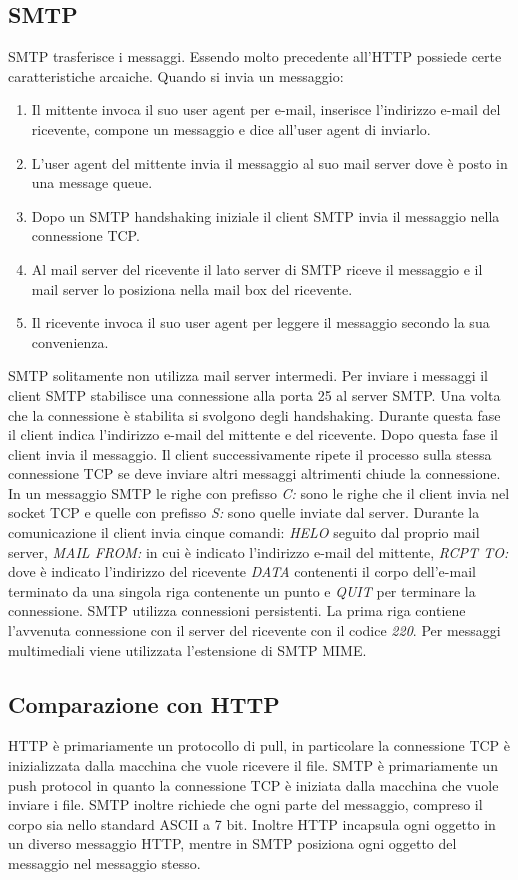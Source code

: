 \subsection{SMTP}
SMTP trasferisce i messaggi. Essendo molto precedente all'HTTP possiede certe caratteristiche arcaiche. Quando si invia un messaggio:
\begin{enumerate}
\item Il mittente invoca il suo user agent per e-mail, inserisce l'indirizzo e-mail del ricevente, compone un messaggio e dice all'user agent di inviarlo.
\item L'user agent del mittente invia il messaggio al suo mail server dove \`e posto in una message queue.
\item Dopo un SMTP handshaking iniziale il client SMTP invia il messaggio nella connessione TCP.
\item Al mail server del ricevente il lato server di SMTP riceve il messaggio e il mail server lo posiziona nella mail box del ricevente.
\item Il ricevente invoca il suo user agent per leggere il messaggio secondo la sua convenienza.
\end{enumerate}
SMTP solitamente non utilizza mail server intermedi. Per inviare i messaggi il client SMTP stabilisce una connessione alla porta 25 al server SMTP. Una volta che la connessione \`e stabilita si svolgono degli 
handshaking. Durante questa fase il client indica l'indirizzo e-mail del mittente e del ricevente. Dopo questa fase il client invia il messaggio. Il client successivamente ripete il processo sulla stessa connessione 
TCP se deve inviare altri messaggi altrimenti chiude la connessione. In un messaggio SMTP le righe con prefisso \emph{C:} sono le righe che il client invia nel socket TCP e quelle con prefisso \emph{S:} sono
quelle inviate dal server. Durante la comunicazione il client invia cinque comandi: \emph{HELO} seguito dal proprio mail server, \emph{MAIL FROM:} in cui \`e indicato l'indirizzo e-mail del mittente, 
\emph{RCPT TO:} dove \`e indicato l'indirizzo del ricevente \emph{DATA} contenenti il corpo dell'e-mail terminato da una singola riga contenente un punto e \emph{QUIT} per terminare la connessione. SMTP
utilizza connessioni persistenti. La prima riga contiene l'avvenuta connessione con il server del ricevente con il codice \emph{220}.
Per messaggi multimediali viene utilizzata l'estensione di SMTP MIME. 
\subsection{Comparazione con HTTP}
HTTP \`e primariamente un protocollo di pull, in particolare la connessione TCP \`e inizializzata dalla macchina che vuole ricevere il file. SMTP \`e primariamente un push protocol in quanto la connessione TCP 
\`e iniziata dalla macchina che vuole inviare i file. SMTP inoltre richiede che ogni parte del messaggio, compreso il corpo sia nello standard ASCII a 7 bit. Inoltre HTTP incapsula ogni oggetto in un diverso
messaggio HTTP, mentre in SMTP posiziona ogni oggetto del messaggio nel messaggio stesso.
